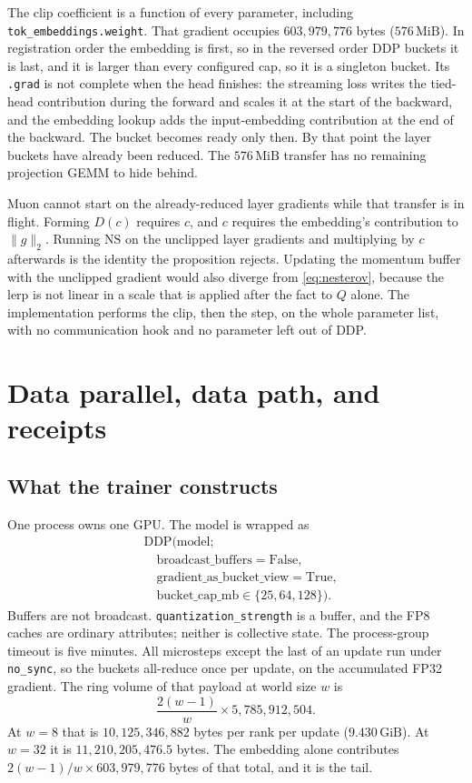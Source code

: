 \documentclass[11pt]{article}
\DeclareRobustCommand{\code}[1]{\texttt{#1}}
\newcommand{\MiB}{\,\mathrm{MiB}}
\newcommand{\GiB}{\,\mathrm{GiB}}
\begin{document}
The clip coefficient is a function of every parameter, including
\code{tok\_embeddings.weight}. That gradient occupies
\(603{,}979{,}776\) bytes (\(576\MiB\)). In registration order the embedding
is first, so in the reversed order DDP buckets it is last, and it is larger
than every configured cap, so it is a singleton bucket. Its \code{.grad} is
not complete when the head finishes: the streaming loss writes the tied-head
contribution during the forward and scales it at the start of the backward,
and the embedding lookup adds the input-embedding contribution at the end of
the backward. The bucket becomes ready only then. By that point the layer
buckets have already been reduced. The \(576\MiB\) transfer has no remaining
projection GEMM to hide behind.

Muon cannot start on the already-reduced layer gradients while that transfer
is in flight. Forming \(D(c)\) requires \(c\), and \(c\) requires the
embedding's contribution to \(\|g\|_2\). Running \(\mathrm{NS}\) on the
unclipped layer gradients and multiplying by \(c\) afterwards is the identity
the proposition rejects. Updating the momentum buffer with the unclipped
gradient would also diverge from \eqref{eq:nesterov}, because the lerp is
not linear in a scale that is applied after the fact to \(Q\) alone. The
implementation performs the clip, then the step, on the whole parameter
list, with no communication hook and no parameter left out of DDP.

\section{Data parallel, data path, and receipts}

\subsection{What the trainer constructs}

One process owns one GPU. The model is wrapped as
\begin{align*}
&\mathrm{DDP}(\mathrm{model};\\
&\quad\mathrm{broadcast\_buffers=False},\\
&\quad\mathrm{gradient\_as\_bucket\_view=True},\\
&\quad\mathrm{bucket\_cap\_mb}\in\{25,64,128\}).
\end{align*}
Buffers are not broadcast. \code{quantization\_strength} is a buffer, and
the FP8 caches are ordinary attributes; neither is collective state. The
process-group timeout is five minutes. All microsteps except the last of an
update run under \code{no\_sync}, so the buckets all-reduce once per update,
on the accumulated FP32 gradient. The ring volume of that payload at world
size \(w\) is
\begin{equation}
\frac{2(w-1)}{w}\times 5{,}785{,}912{,}504.
\end{equation}
At \(w=8\) that is \(10{,}125{,}346{,}882\) bytes per rank per update
(\(9.430\GiB\)). At \(w=32\) it is \(11{,}210{,}205{,}476.5\) bytes. The
embedding alone contributes
\(2(w-1)/w\times 603{,}979{,}776\) bytes of that total, and it is the tail.
\end{document}
